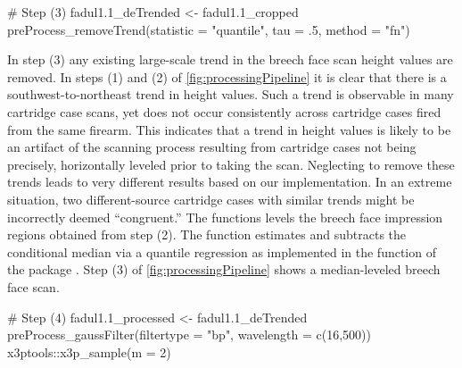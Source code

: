 \begin{Schunk}
\begin{Sinput}
# Step (3)
fadul1.1_deTrended <- fadul1.1_cropped %
  preProcess_removeTrend(statistic = "quantile", tau = .5, method = "fn")
\end{Sinput}
\end{Schunk}

In step (3) any existing large-scale trend in the breech face scan
height values are removed. In steps (1) and (2) of
\autoref{fig:processingPipeline} it is clear that there is a
southwest-to-northeast trend in height values. Such a trend is
observable in many cartridge case scans, yet does not occur consistently
across cartridge cases fired from the same firearm. This indicates that
a trend in height values is likely to be an artifact of the scanning
process resulting from cartridge cases not being precisely, horizontally
leveled prior to taking the scan. Neglecting to remove these trends
leads to very different results based on our implementation. In an
extreme situation, two different-source cartridge cases with similar
trends might be incorrectly deemed ``congruent.'' The
 functions levels the breech face
impression regions obtained from step (2). The function estimates and
subtracts the conditional median via a quantile regression as
implemented in the  function of the  package
\citep{quantreg}. Step (3) of \autoref{fig:processingPipeline} shows a
median-leveled breech face scan.

\begin{Schunk}
\begin{Sinput}
# Step (4)
fadul1.1_processed <- fadul1.1_deTrended %
  preProcess_gaussFilter(filtertype = "bp", wavelength = c(16,500)) %
  x3ptools::x3p_sample(m = 2)
\end{Sinput}
\end{Schunk}


